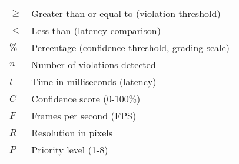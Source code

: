 \documentclass[reqno,12pt,oneside]{report} %
\theoremstyle{plain}
\theoremstyle{definition}
\theoremstyle{remark}
\numberwithin{theorem}{chapter}     %
\begin{document}
\begin{tabular}{p{2.5cm}p{10cm}}
$\geq$  & Greater than or equal to (violation threshold)\\
$<$  & Less than (latency comparison)\\
$\%$  & Percentage (confidence threshold, grading scale)\\
$n$  & Number of violations detected\\
$t$  & Time in milliseconds (latency)\\
$C$  & Confidence score (0-100\%)\\
$F$  & Frames per second (FPS)\\
$R$  & Resolution in pixels\\
$P$  & Priority level (1-8)\\

\end{tabular}

%
\listoffigures   %
\listoftables        %
\tableofcontents     %

\printnomenclature[1.5cm]




\end{document}
